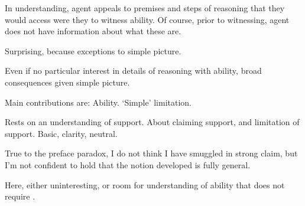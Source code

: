 \begin{note}
  In \WR{} understanding, agent appeals to premises and steps of reasoning that they would access were they to witness ability.
  Of course, prior to witnessing, agent does not have information about what these are.

  Surprising, because exceptions to simple picture.

  Even if no particular interest in details of reasoning with ability, broad consequences given simple picture.
\end{note}

\begin{note}
  Main contributions are:
  Ability.
  `Simple' limitation.
\end{note}

\begin{note}
  Rests on an understanding of support.
  About claiming support, and limitation of support.
  Basic, clarity, neutral.

  True to the preface paradox, I do not think I have smuggled in strong claim, but I'm not confident to hold that the notion developed is fully general.

  Here, either uninteresting, or room for understanding of ability that does not require \WR{}.
\end{note}